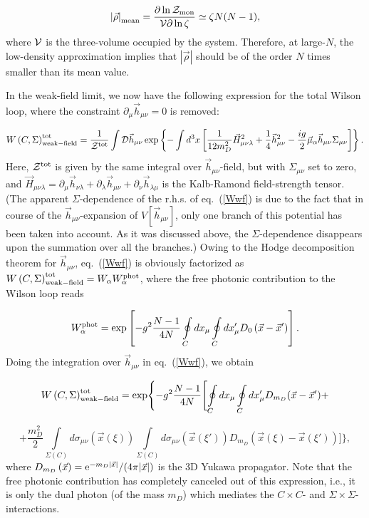 \documentclass[a4paper,12pt]{article}
\begin{document}
$$
\left|\vec\rho\right|_{\rm mean}=\frac{\partial\ln{\cal Z}_{\rm mon}}{{\cal V}\partial\ln\zeta}\simeq\zeta N(N-1),$$
where ${\cal V}$ is the three-volume occupied by the system.
Therefore, at large-$N$, the low-density approximation implies that $|\vec\rho|$ should be of the order $N$ times smaller than its mean value.

In the weak-field limit, we now have the following expression for the total Wilson loop, where the constraint
$\partial_\mu\vec h_{\mu\nu}=0$ is removed:

\begin{equation}
\label{Wwf}
W\left(C,\Sigma\right)_{\rm weak-field}^{\rm tot}=\frac{1}{{\cal Z}^{\rm tot}}
\int{\cal D}\vec h_{\mu\nu}\exp\left\{-\int d^3x\left[\frac{1}{12m_D^2}\vec H_{\mu\nu\lambda}^2
+\frac14\vec h_{\mu\nu}^2-\frac{ig}{2}\vec\mu_\alpha\vec h_{\mu\nu}\Sigma_{\mu\nu}\right]\right\}.
\end{equation}
Here, ${\cal Z}^{\rm tot}$ is given by the same integral over $\vec h_{\mu\nu}$-field, but with $\Sigma_{\mu\nu}$ set to zero, and
$\vec H_{\mu\nu\lambda}=\partial_\mu\vec h_{\nu\lambda}+\partial_\lambda\vec h_{\mu\nu}+
\partial_\nu\vec h_{\lambda\mu}$ is the Kalb-Ramond field-strength tensor. (The apparent $\Sigma$-dependence of the r.h.s. of eq.~(\ref{Wwf})
is due to the fact that in course of the $\vec h_{\mu\nu}$-expansion of $V\left[\vec h_{\mu\nu}\right]$, only one branch of this potential
has been taken into account. As it was discussed above, the $\Sigma$-dependence disappears upon the summation over all the branches.)
Owing to the Hodge decomposition theorem for $\vec h_{\mu\nu}$,
eq.~(\ref{Wwf}) is obviously factorized as $W\left(C,\Sigma\right)_{\rm weak-field}^{\rm tot}=W_\alpha W_\alpha^{\rm phot}$, where the free
photonic contribution to the Wilson loop reads

\begin{equation}
\label{Fp}
W_\alpha^{\rm phot}=\exp\left[-g^2\frac{N-1}{4N}\oint\limits_{C}^{}dx_\mu\oint\limits_{C}^{}dx'_\mu D_0\left(\vec x-\vec x'\right)\right].
\end{equation}
Doing the integration over $\vec h_{\mu\nu}$ in eq.~(\ref{Wwf}), we obtain

$$W\left(C,\Sigma\right)_{\rm weak-field}^{\rm tot}=
\exp\Biggl\{-g^2\frac{N-1}{4N}\Biggl[\oint\limits_C^{}dx_\mu\oint\limits_C^{}dx'_\mu
D_{m_D}(\vec x-\vec x')+$$

\begin{equation}
\label{WCSig}
+\frac{m_D^2}{2}\int\limits_{\Sigma(C)}^{}d\sigma_{\mu\nu}(\vec x(\xi))
\int\limits_{\Sigma(C)}^{}d\sigma_{\mu\nu}(\vec x(\xi'))D_{m_D}\left(\vec x(\xi)-\vec x(\xi')\right)
\Biggr]\Biggr\},
\end{equation}
where $D_{m_D}\left(\vec x\right)={\rm e}^{-m_D|\vec x|}/(4\pi|\vec x|)$ is the 3D Yukawa propagator.
Note that the free photonic contribution has completely canceled out of this expression, i.e., it is only the dual photon
(of the mass $m_D$) which mediates the $C\times C$- and $\Sigma\times\Sigma$-interactions.
\end{document}
